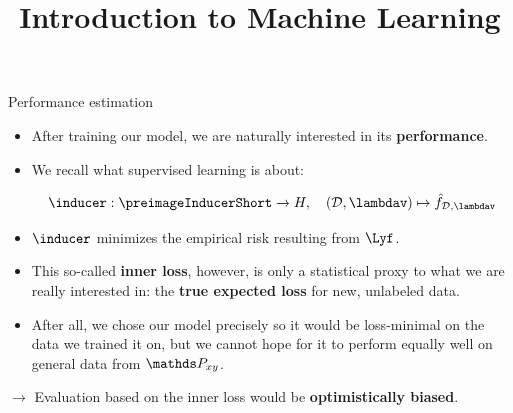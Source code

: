 \documentclass[11pt,compress,t,notes=noshow, xcolor=table]{beamer}
\title{Introduction to Machine Learning}
\institute{\href{https://compstat-lmu.github.io/lecture_i2ml/}{compstat-lmu.github.io/lecture\_i2ml}}
\date{}
\begin{document}








\begin{vbframe}{Performance estimation}

\begin{itemize}
  \item After training our model, we are naturally interested in its
  \textbf{performance}.
  \item We recall what supervised learning is about: 
  
  $$\inducer: \preimageInducerShort \rightarrow \Hspace, \quad (\D, \lambdav)
  \mapsto \fh_{\D, \lambdav}$$
  \item $\inducer$ minimizes the empirical risk resulting from $\Lyf$.
  \item This so-called \textbf{inner loss}, however, is only a statistical proxy
  to what we are really interested in: the \textbf{true expected loss} for 
  new, unlabeled data.
  \item After all, we chose our model precisely so it would be loss-minimal 
  on the data we trained it on, but we cannot hope for it to perform equally 
  well on general data from $\Pxy$.
\end{itemize}

\lz
$\rightarrow$ Evaluation based on the inner loss would be 
\textbf{optimistically biased}.

\end{vbframe}

\end{document}

